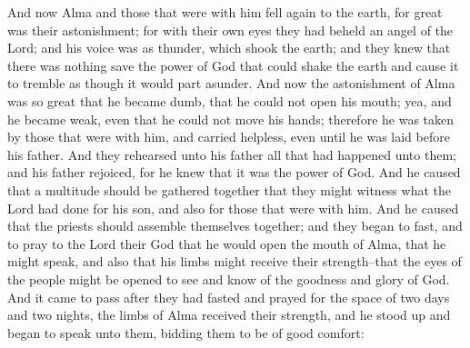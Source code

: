 And now Alma and those that were with him fell again to the earth, for great was their astonishment; for with their own eyes they had beheld an angel of the Lord; and his voice was as thunder, which shook the earth; and they knew that there was nothing save the power of God that could shake the earth and cause it to tremble as though it would part asunder.
\bverse \iffalse And now the astonishment of Alma was so great that he became dumb, that he could not open his mouth; yea, and he became weak, even that he could not move his hands; therefore he was taken by those that were with him, and carried helpless, even until he was laid before his father. \fi
And now the astonishment of Alma was so great that he became dumb, that he could not open his mouth; yea, and he became weak, even that he could not move his hands; therefore he was taken by those that were with him, and carried helpless, even until he was laid before his father.
\bverse \iffalse And they rehearsed unto his father all that had happened unto them; and his father rejoiced, for he knew that it was the power of God. \fi
And they rehearsed unto his father all that had happened unto them; and his father rejoiced, for he knew that it was the power of God.
\bverse \iffalse And he caused that a multitude should be gathered together that they might witness what the Lord had done for his son, and also for those that were with him. \fi
And he caused that a multitude should be gathered together that they might witness what the Lord had done for his son, and also for those that were with him.
\bverse \iffalse And he caused that the priests should assemble themselves together; and they began to fast, and to pray to the Lord their God that he would open the mouth of Alma, that he might speak, and also that his limbs might receive their strength--that the eyes of the people might be opened to see and know of the goodness and glory of God. \fi
And he caused that the priests should assemble themselves together; and they began to fast, and to pray to the Lord their God that he would open the mouth of Alma, that he might speak, and also that his limbs might receive their strength--that the eyes of the people might be opened to see and know of the goodness and glory of God.
\bverse \iffalse And it came to pass after they had fasted and prayed for the space of two days and two nights, the limbs of Alma received their strength, and he stood up and began to speak unto them, bidding them to be of good comfort: \fi
And it came to pass after they had fasted and prayed for the space of two days and two nights, the limbs of Alma received their strength, and he stood up and began to speak unto them, bidding them to be of good comfort:
